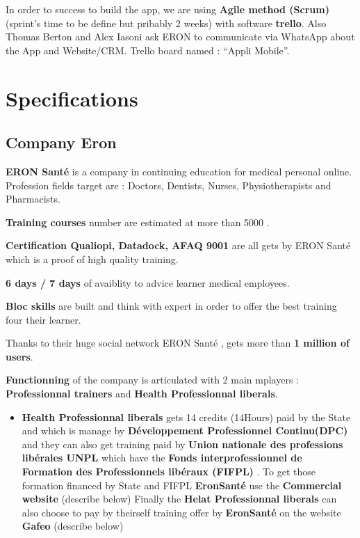 \documentclass[
  12pt,
]{article}
\providecommand{\tightlist}{%
  \setlength{\itemsep}{0pt}\setlength{\parskip}{0pt}}
\begin{document}
In order to success to build the app, we are using \textbf{Agile method
(Scrum)} (sprint's time to be define but pribably 2 weeks) with software
\textbf{trello}. Also Thomas Berton and Alex Iasoni ask ERON to
communicate via WhatsApp about the App and Website/CRM. Trello board
named : ``Appli Mobile''.

\hypertarget{specifications}{%
\section{Specifications}\label{specifications}}

\hypertarget{company-eron}{%
\subsection{Company Eron}\label{company-eron}}

\textbf{ERON Santé} is a company in continuing education for medical
personal online. Profession fields target are : Doctors, Dentists,
Nurses, Physiotherapists and Pharmacists.

\textbf{Training courses} number are estimated at more than 5000 .

\textbf{Certification Qualiopi, Datadock, AFAQ 9001} are all gets by
ERON Santé which is a proof of high quality training.

\textbf{6 days / 7 days} of avaiblity to advice learner medical
employees.

\textbf{Bloc skills} are built and think with expert in order to offer
the best training four their learner.

Thanks to their huge social network ERON Santé , gets more than
\textbf{1 million of users}.

\textbf{Functionning} of the company is articulated with 2 main mplayers
: \textbf{Professionnal trainers} and \textbf{Health Professionnal
liberals}.

\begin{itemize}
\tightlist
\item
  \textbf{Health Professionnal liberals} gets 14 credits (14Hours) paid
  by the State and which is manage by \textbf{Développement
  Professionnel Continu(DPC)} and they can also get training paid by
  \textbf{Union nationale des professions libérales UNPL} which have the
  \textbf{Fonds interprofessionnel de Formation des Professionnels
  libéraux (FIFPL)} . To get those formation financed by State and FIFPL
  \textbf{EronSanté} use the \textbf{Commercial website} (describe
  below) Finally the \textbf{Helat Professionnal liberals} can also
  choose to pay by theirself training offer by \textbf{EronSanté} on the
  website \textbf{Gafeo} (describe below)
\end{itemize}
\end{document}
